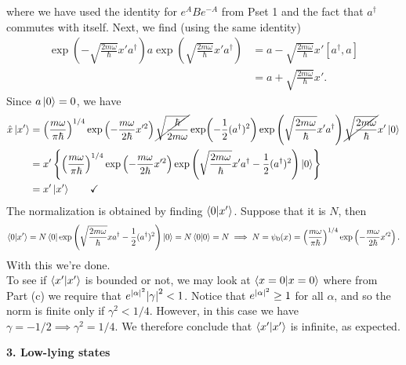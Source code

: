 \documentclass{article}
\theoremstyle{definition}
\newcommand{\al}{\alpha}
\newcommand{\f}[2]{\frac{#1}{#2}}
\newcommand{\lp}{\left(}
\newcommand{\rp}{\right)}
\newcommand{\lc}{\left\{}
\newcommand{\rc}{\right\}}
\begin{document}
\begin{enumerate}[label=(\alph*)]
	where we have used the identity for $e^A B e^{-A}$ from Pset 1 and the fact that $a^\dagger$ commutes with itself. Next, we find (using the same identity) 
	\begin{align*}
	\exp\lp -\sqrt{\f{2m\omega}{\hbar}} x' {a}^\dagger  \rp  a \exp\lp \sqrt{\f{2m\omega}{\hbar}} x' {a}^\dagger  \rp
	&= a -\sqrt{\f{2m\omega}{\hbar}}x'[a^\dagger,a]\\
	&= a + \sqrt{\f{2m\omega}{\hbar}}  x'.
	\end{align*}
	Since $a\ket{0} = 0$, we have
	\begin{align*}
	\hat{x}\ket{x'} &= \lp \f{m\omega}{\pi \hbar} \rp^{1/4} \exp\lp -\f{m\omega}{2\hbar} x'^2\rp \cancel{\sqrt{\f{\hbar}{2m\omega}}} \exp(-\f{1}{2}(a^\dagger)^2) 
	\exp\lp \sqrt{\f{2m\omega}{\hbar}} x' {a}^\dagger  \rp \cancel{\sqrt{\f{2m\omega}{\hbar}}}  x' \ket{0}\\
	&= x' \lc  \lp \f{m\omega}{\pi \hbar} \rp^{1/4} \exp\lp -\f{m\omega}{2\hbar} x'^2\rp\exp\lp \sqrt{\f{2m\omega}{\hbar}} x' {a}^\dagger - \f{1}{2}({a}^\dagger)^2 \rp \ket{0}\rc\\
	&= x'\ket{x'} \quad\quad\checkmark
	\end{align*}
	The normalization is obtained by finding $\bra{0}\ket{x'}$. Suppose that it is $N$, then 
	\begin{align*}
	\bra{0}\ket{x'} = N\bra{0}\exp\lp \sqrt{\f{2m\omega}{\hbar}} x a^\dagger - \f{1}{2}(a^\dagger)^2 \rp \ket{0} = N\braket{0} = N \implies  N = \psi_0(x) =  \lp \f{m\omega}{\pi \hbar} \rp^{1/4} \exp\lp -\f{m\omega}{2\hbar} x'^2\rp.
	\end{align*}
	With this we're done. \\
	
	To see if $\braket{x'}$ is bounded or not, we may look at $\bra{x=0}\ket{x=0}$ where from Part (c) we require that $e^{\abs{\al}^2} \abs{\gamma}^2 < 1$. Notice that $e^{\abs{\al}^2} \geq 1$ for all $\al$, and so the norm is finite only if $\gamma^2 < 1/4$. However, in this case we have $\gamma = -1/2 \implies \gamma^2 = 1/4$. We therefore conclude that $\braket{x'}$ is infinite, as expected. 
	
	
\end{enumerate}

\noindent \textbf{3. Low-lying states}
\end{document}
